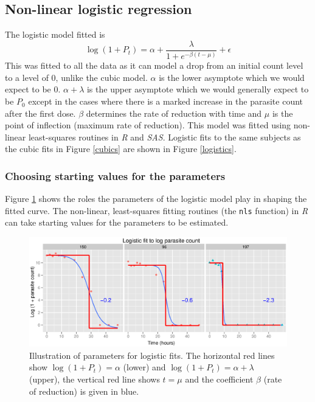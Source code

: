 \subsection{Non-linear logistic regression}
The logistic model fitted is
$$\log(1+P_t)=\alpha+\frac{\lambda}{1+e^{-\beta(t-\mu)}}+\epsilon$$
This was fitted to all the data as it can model a drop from an initial count level to a level of 0, unlike the cubic model. $\alpha$ is the lower asymptote which we would expect to be 0. $\alpha+\lambda$ is the upper asymptote which we would generally expect to be $P_0$ except in the cases where there is a marked increase in the parasite count after the first dose. $\beta$ determines the rate of reduction with time and $\mu$ is the point of inflection (maximum rate of reduction). This model was fitted using non-linear least-squares routines in \emph{R} and \emph{SAS}. Logistic fits to the same subjects as the cubic fits in Figure \ref{cubics} are shown in Figure \ref{logistics}.
\subsubsection*{Choosing starting values for the parameters}
Figure \ref{logparms} shows the roles the parameters of the logistic model play in shaping the fitted curve. The non-linear, least-squares fitting routines (the \texttt{nls} function) in \emph{R} can take starting values for the parameters to be estimated.
\begin{figure}[h]
\includegraphics[width=6.1in]{logparms.eps} 
\caption{Illustration of parameters for logistic fits.\newline
The horizontal red lines show $\log(1+P_t)=\alpha$ (lower) and $\log(1+P_t)=\alpha+\lambda$ (upper), the vertical red line shows $t=\mu$ and the coefficient $\beta$ (rate of reduction) is given in blue.}\label{logparms}
\end{figure}

